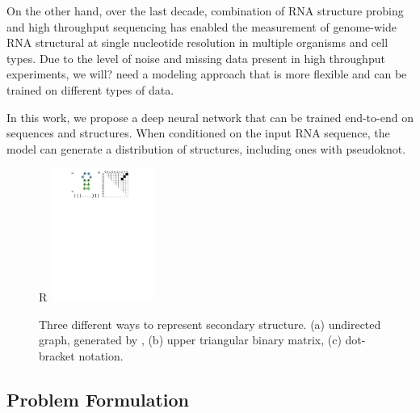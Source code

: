 \documentclass{article}
\begin{document}
On the other hand, over the last decade,
combination of RNA structure probing and high throughput sequencing has enabled
the measurement of genome-wide RNA structural at single nucleotide resolution in
multiple organisms and cell types\cite{mortimer2014insights, bevilacqua2016genome}.
Due to the level of noise and missing data present in high throughput experiments,
we will? need a modeling approach that is more flexible and can be trained on different types of data.
%

In this work, we propose a deep neural network that can be trained end-to-end on
sequences and structures. When conditioned on the input RNA sequence,
the model can generate a distribution of structures, including ones with pseudoknot.

%
%

\begin{figure}{R}
        \centering
        \includegraphics[width=0.3\textwidth]{plot/rna_ss_binary_mat.pdf}
        \caption{Three different ways to represent secondary structure. (a) undirected graph, generated by \cite{kerpedjiev2015forna}, (b) upper triangular binary matrix, (c) dot-bracket notation.}
        \label{fig:rna_ss_binary_mat}
        \centering
\end{figure}

\subsection{Problem Formulation}
\end{document}
